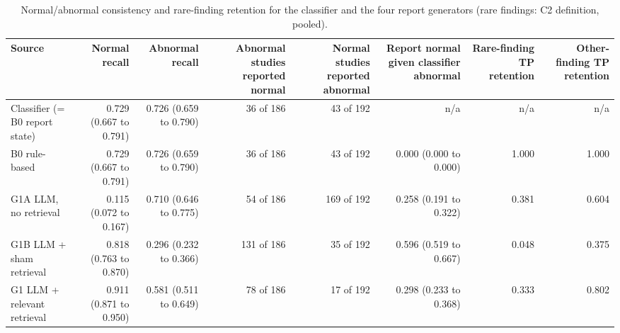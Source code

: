 \begin{table}[t]
\centering
\scriptsize
\begin{tabular}{lrrrrrrr}
\hline
Source & Normal recall & Abnormal recall & Abnormal studies reported normal & Normal studies reported abnormal & Report normal given classifier abnormal & Rare-finding TP retention & Other-finding TP retention \\
\hline
Classifier (= B0 report state) & 0.729 (0.667 to 0.791) & 0.726 (0.659 to 0.790) & 36 of 186 & 43 of 192 & n/a & n/a & n/a \\
B0 rule-based & 0.729 (0.667 to 0.791) & 0.726 (0.659 to 0.790) & 36 of 186 & 43 of 192 & 0.000 (0.000 to 0.000) & 1.000 & 1.000 \\
G1A LLM, no retrieval & 0.115 (0.072 to 0.167) & 0.710 (0.646 to 0.775) & 54 of 186 & 169 of 192 & 0.258 (0.191 to 0.322) & 0.381 & 0.604 \\
G1B LLM + sham retrieval & 0.818 (0.763 to 0.870) & 0.296 (0.232 to 0.366) & 131 of 186 & 35 of 192 & 0.596 (0.519 to 0.667) & 0.048 & 0.375 \\
G1 LLM + relevant retrieval & 0.911 (0.871 to 0.950) & 0.581 (0.511 to 0.649) & 78 of 186 & 17 of 192 & 0.298 (0.233 to 0.368) & 0.333 & 0.802 \\
\hline
\end{tabular}
\caption{Normal/abnormal consistency and rare-finding retention for the classifier and the four report generators (rare findings: C2 definition, pooled).}
\label{tab:table5_normal_abnormal_and_rare_findings}
\end{table}
